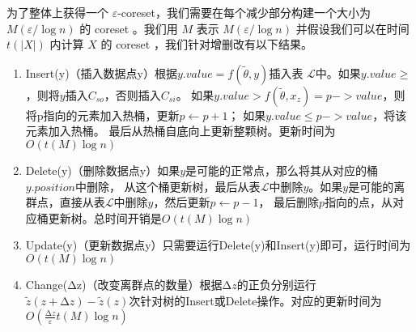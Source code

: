 为了整体上获得一个 $\varepsilon$-coreset，我们需要在每个减少部分构建一个大小为 $M(\varepsilon / \log n)$ 的 coreset \citep{AHV04}。我们用 $M$ 表示 $M(\varepsilon / \log n)$ 并假设我们可以在时间 $t(|X|)$ 内计算 $X$ 的 coreset \citep{Sch14}，我们针对增删改有以下结果。

\begin{enumerate}
    \item Insert(y)（插入数据点y）根据$y.value=f(\tilde{\theta},y)$插入表
    $\mathcal{L}$中。如果$y.value\geq $，则将$y$插入$C_{so}$，否则插入$C_{si}$。
    如果$y.value>f(\tilde{\theta},x_z)=p->value$，则将p指向的元素加入热桶，更新$p\leftarrow p+1$；
    如果$y.value\leq p->value$，将该元素加入热桶。
    最后从热桶自底向上更新整颗树。更新时间为$O\left(t(M)\log n\right)$
    \item Delete(y)（删除数据点y）如果$y$是可能的正常点，那么将其从对应的桶$y.position$中删除，
    从这个桶更新树，最后从表$\mathcal{L}$中删除$y$。如果$y$是可能的离群点，直接从表$\mathcal{L}$中删除$y$，然后更新$p\leftarrow p-1$，
    最后删除$p$指向的点，从对应桶更新树。总时间开销是$O\left(t(M)\log n\right)$
    \item Update(y)（更新数据点y）只需要运行Delete(y)和Insert(y)即可，运行时间为$O\left(t(M)\log n\right)$
    \item Change($\increment$z)（改变离群点的数量）根据$\increment z$的正负分别运行$\tilde{z}(z+\increment z)-\tilde{z}(z)$次针对树的Insert或Delete操作。对应的更新时间为$O\left(\frac{\increment z}{\varepsilon}t(M)\log n\right)$
\end{enumerate}
